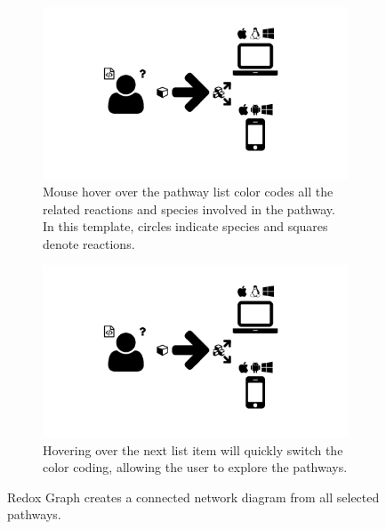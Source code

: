 \begin{figure}
  \centering
  \begin{subfigure}[b]{\textwidth}
    \includegraphics[width=\textwidth, page=6,trim=0.37cm 3.65cm 13.1cm 3.3cm, clip=true]{images/Figures.pdf}
    \caption{Mouse hover over the pathway list color codes all the related reactions and species involved in the pathway. In this template, circles indicate species and squares denote reactions.}
    \label{Figure:redox-graph-highlight1}
  \end{subfigure}
  \begin{subfigure}[b]{\textwidth}
    \includegraphics[width=\textwidth, page=6,trim=13.1cm 3.65cm 0.37cm 3.3cm, clip=true]{images/Figures.pdf}
    \caption{Hovering over the next list item will quickly switch the color coding, allowing the user to explore the pathways.}
    \label{Figure:redox-graph-highlight2}
  \end{subfigure}
  \caption{Redox Graph creates a connected network diagram from all selected pathways.}
  \label{Figure:redox-graph-highlight}
\end{figure}

